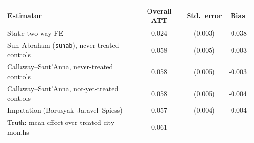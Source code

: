 \begin{tabular}{lccc}\toprule
Estimator & Overall ATT & Std.\ error & Bias \\ \midrule
Static two-way FE & 0.024 & (0.003) & -0.038 \\
Sun--Abraham (\texttt{sunab}), never-treated controls & 0.058 & (0.005) & -0.003 \\
Callaway--Sant'Anna, never-treated controls & 0.058 & (0.005) & -0.003 \\
Callaway--Sant'Anna, not-yet-treated controls & 0.058 & (0.005) & -0.004 \\
Imputation (Borusyak--Jaravel--Spiess) & 0.057 & (0.004) & -0.004 \\
\midrule
Truth: mean effect over treated city-months & 0.061 & &  \\
\bottomrule\end{tabular}
